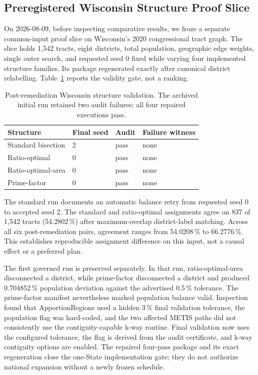 \subsection{Preregistered Wisconsin Structure Proof Slice}

On 2026-08-09, before inspecting comparative results, we froze a separate
common-input proof slice on Wisconsin's 2020 congressional tract graph. The
slice holds 1,542 tracts, eight districts, total population, geographic edge
weights, single outer search, and requested seed 0 fixed while varying four
implemented structure families. Its package regenerated exactly after
canonical district relabelling. Table~\ref{tab:wi-structure-proof} reports the
validity gate, not a ranking.

\begin{table}[h]
\centering
\caption{Post-remediation Wisconsin structure validation. The archived initial
  run retained two audit failures; all four repaired executions pass.}
\label{tab:wi-structure-proof}
\small
\begin{tabular}{llll}
\toprule
\textbf{Structure} & \textbf{Final seed} & \textbf{Audit} & \textbf{Failure witness} \\
\midrule
Standard bisection & 2 & pass & none \\
Ratio-optimal & 0 & pass & none \\
Ratio-optimal-area & 0 & pass & none \\
Prime-factor & 0 & pass & none \\
\bottomrule
\end{tabular}
\end{table}

The standard run documents an automatic balance retry from requested seed 0
to accepted seed 2. The standard and ratio-optimal assignments agree on 837 of
1,542 tracts (54.2802\,\%) after maximum-overlap district-label matching.
Across all six post-remediation pairs, agreement ranges from 54.0208\,\% to
66.2776\,\%. This establishes reproducible assignment difference on this
input, not a causal effect or a preferred plan.

The first governed run is preserved separately. In that run,
ratio-optimal-area disconnected a district, while prime-factor disconnected a
district and produced 0.704852\,\% population deviation against the advertised
0.5\,\% tolerance. The prime-factor manifest nevertheless marked population
balance valid. Inspection found that ApportionRegions used a hidden 3\,\%
final validation tolerance, the population flag was hard-coded, and the two
affected METIS paths did not consistently use the contiguity-capable k-way
routine. Final validation now uses the configured tolerance, the flag is
derived from the audit certificate, and k-way contiguity options are enabled.
The repaired four-pass package and its exact regeneration close the one-State
implementation gate; they do not authorize national expansion without a newly
frozen schedule.

